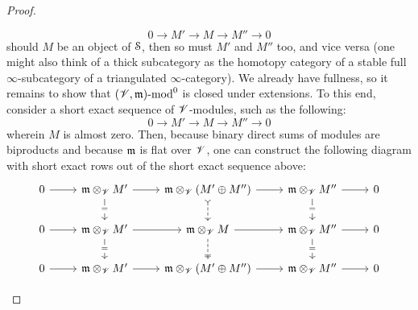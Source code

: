\begin{proof}
\begin{enumerate}
                            $$0 \to M' \to M \to M'' \to 0$$
                        should $M$ be an object of $\S$, then so must $M'$ and $M''$ too, and vice versa (one might also think of a thick subcategory as the homotopy category of a stable full $\infty$-subcategory of a triangulated $\infty$-category). We already have fullness, so it remains to show that $(\scrV, \m)\mod^0$ is closed under extensions. To this end, consider a short exact sequence of $\scrV$-modules, such as the following:
                            $$0 \to M' \to M \to M'' \to 0$$
                        wherein $M$ is almost zero. Then, because binary direct sums of modules are biproducts and because $\m$ is flat over $\scrV$, one can construct the following diagram with short exact rows out of the short exact sequence above:
                            $$
                                \begin{tikzcd}
                                	0 & {\m \tensor_{\scrV} M'} & {\m \tensor_{\scrV} (M' \oplus M'')} & {\m \tensor_{\scrV} M''} & 0 \\
                                	0 & {\m \tensor_{\scrV} M'} & {\m \tensor_{\scrV} M} & {\m \tensor_{\scrV} M''} & 0 \\
                                	0 & {\m \tensor_{\scrV} M'} & {\m \tensor_{\scrV} (M' \oplus M'')} & {\m \tensor_{\scrV} M''} & 0
                                	\arrow[from=1-1, to=1-2]
                                	\arrow[from=1-2, to=1-3]
                                	\arrow[from=1-3, to=1-4]
                                	\arrow[from=1-4, to=1-5]
                                	\arrow[from=2-1, to=2-2]
                                	\arrow[from=2-2, to=2-3]
                                	\arrow[from=2-3, to=2-4]
                                	\arrow[from=2-4, to=2-5]
                                	\arrow[from=3-1, to=3-2]
                                	\arrow[from=3-2, to=3-3]
                                	\arrow[from=3-3, to=3-4]
                                	\arrow[from=3-4, to=3-5]
                                	\arrow["{=}"{description}, from=2-2, to=3-2]
                                	\arrow[dashed, tail, from=1-3, to=2-3]
                                	\arrow[dashed, two heads, from=2-3, to=3-3]
                                	\arrow["{=}"{description}, from=1-4, to=2-4]
                                	\arrow["{=}"{description}, from=2-4, to=3-4]
                                	\arrow["{=}"{description}, from=1-2, to=2-2]
                                \end{tikzcd}
$$
\end{enumerate}
\end{proof}
